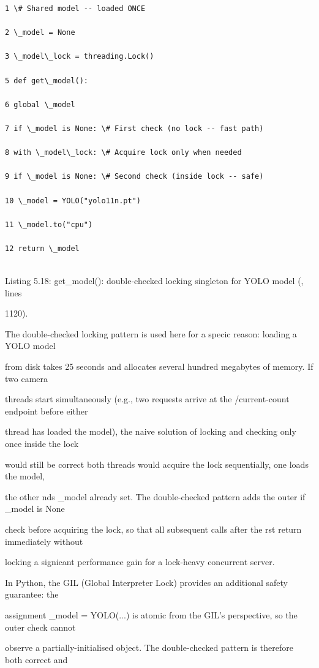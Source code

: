 \begin{listingbox}
	\begin{verbatim}
1 \# Shared model -- loaded ONCE

2 \_model = None

3 \_model\_lock = threading.Lock()

5 def get\_model():

6 global \_model

7 if \_model is None: \# First check (no lock -- fast path)

8 with \_model\_lock: \# Acquire lock only when needed

9 if \_model is None: \# Second check (inside lock -- safe)

10 \_model = YOLO("yolo11n.pt")

11 \_model.to("cpu")

12 return \_model


\end{verbatim}
\end{listingbox}
Listing 5.18: get\_model(): double-checked locking singleton for YOLO model (, lines

1120).

The double-checked locking pattern is used here for a specic reason: loading a YOLO model

from disk takes 25 seconds and allocates several hundred megabytes of memory. If two camera

threads start simultaneously (e.g., two requests arrive at the /current-count endpoint before either

thread has loaded the model), the naive solution of locking and checking only once inside the lock

would still be correct  both threads would acquire the lock sequentially, one loads the model,

the other nds \_model already set. The double-checked pattern adds the outer if \_model is None

check before acquiring the lock, so that all subsequent calls after the rst return immediately without

locking  a signicant performance gain for a lock-heavy concurrent server.

In Python, the GIL (Global Interpreter Lock) provides an additional safety guarantee: the

assignment \_model = YOLO(...) is atomic from the GIL's perspective, so the outer check cannot

observe a partially-initialised object. The double-checked pattern is therefore both correct and

